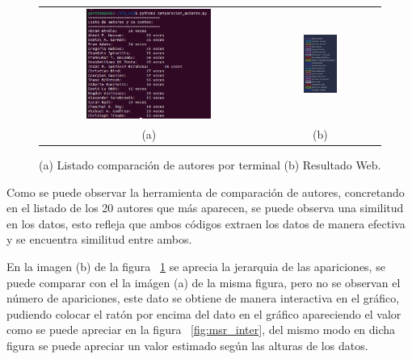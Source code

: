 \documentclass[a4paper, 12pt]{book}
\begin{document}
\begin{figure}[h]
    \centering
    \begin{tabular}{cc}
    \includegraphics[width=0.595\textwidth]{img/MSR_list_count.png} &  
    \includegraphics[width=0.3\textwidth]{img/MSR_list_l.png} \\
    (a) &(b)
    \end{tabular}
    \caption{(a) Listado comparación de autores por terminal (b) Resultado Web.}
    \label{fig:comp_MSR}
\end{figure}


Como se puede observar la herramienta de comparación de autores, concretando en el listado de los 20 autores que más aparecen, se puede observa una similitud en los datos, esto refleja que ambos códigos extraen los datos de manera efectiva y se encuentra similitud entre ambos. 

En la imagen (b) de la figura ~\ref{fig:comp_MSR} se aprecia la jerarquia de las apariciones, se puede comparar con el la imágen (a) de la misma figura, pero no se observan el número de apariciones, este dato se obtiene de manera interactiva en el gráfico, pudiendo colocar el ratón por encima del dato en el gráfico apareciendo el valor como se puede apreciar en la figura ~\ref{fig:msr_inter}, del mismo modo en dicha figura se puede apreciar un valor estimado según las alturas de los datos.
\end{document}
